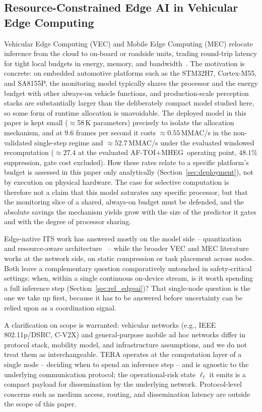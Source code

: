 \documentclass[a4paper,fleqn]{cas-dc}
\newcommand{\MHEG}{\mbox{MHEG}\xspace}
\begin{document}
\subsection{Resource-Constrained Edge AI in Vehicular Edge Computing}
\label{sec:rel_vec}
Vehicular Edge Computing (VEC) and Mobile Edge Computing (MEC) relocate inference
from the cloud to on-board or roadside units, trading round-trip latency for tight
local budgets in energy, memory, and bandwidth~\cite{gill2025edgeai,bouhsissin2023driver,ortega2020dmd}.
The motivation is concrete: on embedded automotive platforms such as the
STM32H7, Cortex-M55, and SA8155P, the monitoring model typically shares the
processor and the energy budget with other always-on vehicle functions, and
production-scale perception stacks are substantially larger than the
deliberately compact model studied here, so some form of runtime allocation is
unavoidable. {\color{\revcolor}The deployed model in this paper is kept small
($\approx$58\,K parameters) precisely to isolate the allocation mechanism, and
at $9.6$ frames per second it costs
${\approx}0.55$\,MMAC/s in the non-validated single-step regime and
${\approx}52.7$\,MMAC/s under the evaluated windowed recomputation
(${\approx}27.4$ at the evaluated \mbox{AF-TOI}+\MHEG\ operating point,
$48.1\%$ suppression, gate cost excluded). How these rates relate to a
specific platform's budget is assessed in this paper only analytically
(Section~\ref{sec:deployment}), not by execution on physical hardware. The
case for selective computation is therefore not a claim that this model
saturates any specific processor, but that the monitoring slice of a shared,
always-on budget must be defended, and the
absolute savings the mechanism yields grow with the size of the predictor it
gates and with the degree of processor sharing.}

Edge-native ITS work has answered mostly
on the model side -- quantization~\cite{hariharan2023driveredge} and resource-aware
architecture~\cite{almodhwahi2025facial} -- while the broader VEC and MEC literature
works at the network side, on static compression or task placement across nodes.
Both leave a complementary question comparatively untouched in safety-critical
settings: when, within a single continuous on-device stream, is it worth
spending a full inference step (Section~\ref{sec:rel_edgeai})? That single-node
question is the one we take up first, because it has to be answered before
uncertainty can be relied upon as a coordination signal.

{\color{\revcolor}A clarification on scope is warranted: vehicular networks (e.g.,
IEEE 802.11p/DSRC, C-V2X) and general-purpose mobile ad hoc networks differ in
protocol stack, mobility model, and infrastructure assumptions, and we do not
treat them as interchangeable. TERA operates at the computation layer
of a single node -- deciding when to spend an inference step -- and is
agnostic to the underlying communication protocol; the operational-risk state
$\ell_t$ it emits is a compact payload for dissemination by the underlying
network. Protocol-level concerns such as medium access, routing, and
dissemination latency are outside the scope of this paper.}
\end{document}
